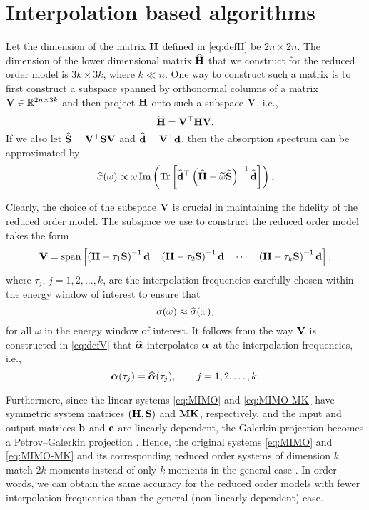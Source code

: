 \section{Interpolation based algorithms}
\label{sec:mor}

Let the dimension of the matrix $\mathbf{H}$ defined in \eqref{eq:defH} be $2n \times 2n$. The dimension of the lower dimensional matrix $\widehat{\mathbf{H}}$ that we construct for the reduced order model is $3k \times 3k$, where $k \ll n$. One way to construct such a matrix is to first construct a subspace spanned by orthonormal columns of a matrix $\bV \inR[2n][3k]$ and then project $\mathbf{H}$ onto such a subspace $\mathbf{V}$, i.e.,
\begin{equation}
  \widehat{\mathbf{H}} = \mathbf{V}^\top \mathbf{H} \mathbf{V}.
\end{equation}
If we also let $\widehat{\mathbf{S}} = \mathbf{V}^\top \mathbf{S} \mathbf{V}$ and $\widehat{\mathbf{d}} = \mathbf{V}^\top \mathbf{d}$, then the absorption spectrum can be approximated by
\begin{equation}
  \widehat{\sigma}(\omega) \propto \omega \operatorname{Im}\left(\operatorname{Tr}\left[ \widehat{\mathbf{d}}^\top \left( \widehat{\mathbf{H}} - \widetilde{\omega}\widehat{\mathbf{S}} \right)^{-1} \widehat{\mathbf{d}} \right]\right).
  \label{eq:abs-spectrum-k}
\end{equation}

Clearly, the choice of the subspace $\mathbf{V}$ is crucial in maintaining the 
fidelity of the reduced order model.  The subspace we use to construct the reduced order model takes the form
\begin{equation}
  \mathbf{V} = \mathrm{span}\left[ \left( \mathbf{H} - \tau_1\mathbf{S} \right)^{-1} \mathbf{d} \quad \left( \mathbf{H} - \tau_2\mathbf{S} \right)^{-1} \mathbf{d} \quad \cdots \quad \left( \mathbf{H} - \tau_k\mathbf{S} \right)^{-1} \mathbf{d}  \right],
  \label{eq:defV}
\end{equation}
where $\tau_j$, $j = 1,2,\ldots,k$, are the interpolation frequencies carefully 
chosen within the energy window of interest to ensure that
\begin{equation}
  \sigma(\omega) \approx \widehat{\sigma}(\omega),
\end{equation}
for all $\omega$ in the energy window of interest. It follows from the way $\mathbf{V}$ is constructed in \eqref{eq:defV} that $\widehat{\boldsymbol{\alpha}}$ interpolates $\boldsymbol{\alpha}$ at the interpolation frequencies, i.e.,
\begin{equation}
  \boldsymbol{\alpha}(\tau_j) = \widehat{\boldsymbol{\alpha}}(\tau_j), \qquad j = 1,2,\ldots,k.
\end{equation}

Furthermore, since the linear systems \eqref{eq:MIMO} and \eqref{eq:MIMO-MK} have symmetric system matrices $(\mathbf{H},\mathbf{S})$ and $\mathbf{M}\mathbf{K}$, respectively, and the input and output matrices $\mathbf{b}$ and $\mathbf{c}$ are linearly dependent, the Galerkin projection becomes a Petrov--Galerkin projection \cite{Antoulas2005}. Hence, the original systems \eqref{eq:MIMO} and \eqref{eq:MIMO-MK} and its corresponding reduced order systems of dimension $k$ match $2k$ moments instead of only $k$ moments in the general case \cite{Antoulas2005}. In order words, we can obtain the same accuracy for the reduced order models with fewer interpolation frequencies than the general (non-linearly dependent) case.

